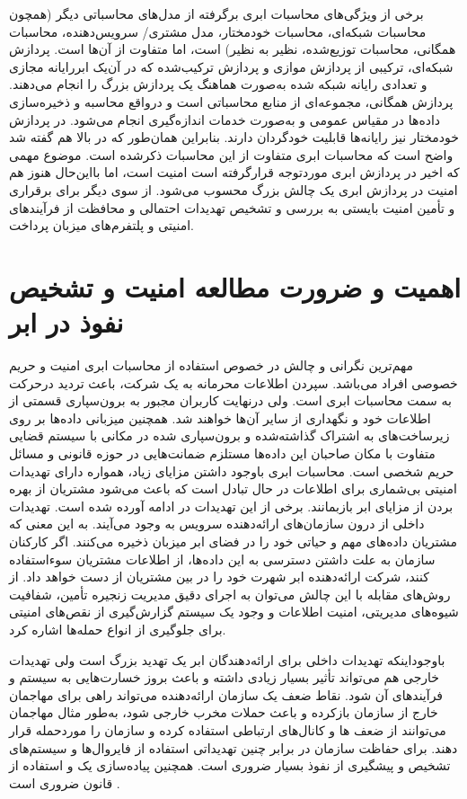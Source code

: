 \documentclass[a4paper,oneside,12pt]{report}
\begin{document}
برخی از ویژگی‌های محاسبات ابری برگرفته از مدل‌های محاسباتی دیگر (همچون محاسبات شبکه‌ای، محاسبات خودمختار، مدل مشتری/ سرویس‌دهنده، محاسبات همگانی، محاسبات توزیع‌شده، نظیر به نظیر) است، اما متفاوت از آن‌ها است. پردازش شبکه‌ای، ترکیبی از پردازش موازی و پردازش ترکیب‌شده که در آن‌یک ابررایانه مجازی و تعدادی رایانه شبکه شده به‌صورت هماهنگ یک پردازش بزرگ را انجام می‌دهند. پردازش همگانی، مجموعه‌ای از منابع محاسباتی است و درواقع محاسبه و ذخیره‌سازی داده‌ها در مقیاس عمومی و به‌صورت خدمات اندازه‌گیری انجام می‌شود. در پردازش خودمختار نیز رایانه‌ها قابلیت خودگردان دارند. بنابراین همان‌طور که در بالا هم گفته شد واضح است که محاسبات ابری متفاوت از این محاسبات ذکرشده است. موضوع مهمی که اخیر در پردازش ابری موردتوجه قرارگرفته است امنیت است، اما بااین‌حال هنوز هم امنیت در پردازش ابری یک چالش بزرگ محسوب می‌شود. از سوی دیگر برای برقراری و تأمین امنیت بایستی به بررسی و تشخیص تهدیدات احتمالی و محافظت از فرآیندهای امنیتی و پلتفرم‌های میزبان پرداخت.
\section{اهمیت و ضرورت مطالعه امنیت و تشخیص نفوذ در ابر}
مهم‌ترین نگرانی و چالش در خصوص استفاده از محاسبات ابری امنیت و حریم خصوصی افراد می‌باشد. سپردن اطلاعات محرمانه به یک شرکت، باعث تردید درحرکت به سمت محاسبات ابری است. ولی درنهایت کاربران مجبور به برون‌سپاری قسمتی از اطلاعات خود و نگهداری از سایر آن‌ها خواهند شد. همچنین میزبانی داده‌ها بر روی زیرساخت‌های به اشتراک گذاشته‌شده و برون‌سپاری شده در مکانی با سیستم قضایی متفاوت با مکان صاحبان این داده‌ها مستلزم ضمانت‌هایی در حوزه قانونی و مسائل حریم شخصی است. محاسبات ابری باوجود داشتن مزایای زیاد، همواره دارای تهدیدات امنیتی بی‌شماری برای اطلاعات در حال تبادل است که باعث می‌شود مشتریان از بهره بردن از مزایای ابر بازبمانند. برخی از این تهدیدات در ادامه آورده شده است. تهدیدات داخلی از درون سازمان‌های ارائه‌دهنده سرویس به وجود می‌آیند. به این معنی که مشتریان داده‌های مهم و حیاتی خود را در فضای ابر میزبان ذخیره می‌کنند. اگر کارکنان سازمان به علت داشتن دسترسی به این داده‌ها، از اطلاعات مشتریان سوءاستفاده کنند، شرکت ارائه‌دهنده ابر شهرت خود را در بین مشتریان از دست خواهد داد. از روش‌های مقابله با این چالش می‌توان به اجرای دقیق مدیریت زنجیره تأمین، شفافیت شیوه‌های مدیریتی، امنیت اطلاعات و وجود یک سیستم گزارش‌گیری از نقص‌های امنیتی برای جلوگیری از انواع حمله‌ها اشاره کرد.

باوجوداینکه تهدیدات داخلی برای ارائه‌دهندگان ابر یک تهدید بزرگ است ولی تهدیدات خارجی هم می‌تواند تأثیر بسیار زیادی داشته و باعث بروز خسارت‌هایی به سیستم و فرآیندهای آن شود. نقاط ضعف یک سازمان ارائه‌دهنده می‌تواند راهی برای مهاجمان خارج از سازمان بازکرده و باعث حملات مخرب خارجی شود، به‌طور مثال مهاجمان می‌توانند از ضعف 
%
ها
و کانال‌های ارتباطی استفاده کرده و سازمان را موردحمله قرار دهند. برای حفاظت سازمان در برابر چنین تهدیداتی استفاده از فایروال‌ها و سیستم‌های تشخیص و پیشگیری از نفوذ بسیار ضروری است. همچنین پیاده‌سازی یک 
و استفاده از قانون 
%
ضروری است
\cite{5}.
\end{document}
